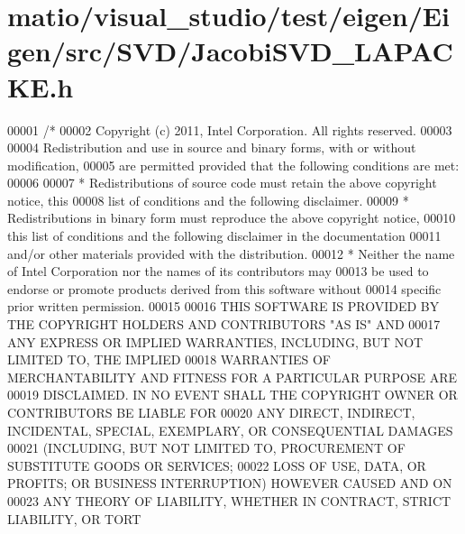 \hypertarget{matio_2visual__studio_2test_2eigen_2_eigen_2src_2_s_v_d_2_jacobi_s_v_d___l_a_p_a_c_k_e_8h_source}{}\section{matio/visual\+\_\+studio/test/eigen/\+Eigen/src/\+S\+V\+D/\+Jacobi\+S\+V\+D\+\_\+\+L\+A\+P\+A\+C\+KE.h}
\label{matio_2visual__studio_2test_2eigen_2_eigen_2src_2_s_v_d_2_jacobi_s_v_d___l_a_p_a_c_k_e_8h_source}

\begin{DoxyCode}
00001 \textcolor{comment}{/*}
00002 \textcolor{comment}{ Copyright (c) 2011, Intel Corporation. All rights reserved.}
00003 \textcolor{comment}{}
00004 \textcolor{comment}{ Redistribution and use in source and binary forms, with or without modification,}
00005 \textcolor{comment}{ are permitted provided that the following conditions are met:}
00006 \textcolor{comment}{}
00007 \textcolor{comment}{ * Redistributions of source code must retain the above copyright notice, this}
00008 \textcolor{comment}{   list of conditions and the following disclaimer.}
00009 \textcolor{comment}{ * Redistributions in binary form must reproduce the above copyright notice,}
00010 \textcolor{comment}{   this list of conditions and the following disclaimer in the documentation}
00011 \textcolor{comment}{   and/or other materials provided with the distribution.}
00012 \textcolor{comment}{ * Neither the name of Intel Corporation nor the names of its contributors may}
00013 \textcolor{comment}{   be used to endorse or promote products derived from this software without}
00014 \textcolor{comment}{   specific prior written permission.}
00015 \textcolor{comment}{}
00016 \textcolor{comment}{ THIS SOFTWARE IS PROVIDED BY THE COPYRIGHT HOLDERS AND CONTRIBUTORS "AS IS" AND}
00017 \textcolor{comment}{ ANY EXPRESS OR IMPLIED WARRANTIES, INCLUDING, BUT NOT LIMITED TO, THE IMPLIED}
00018 \textcolor{comment}{ WARRANTIES OF MERCHANTABILITY AND FITNESS FOR A PARTICULAR PURPOSE ARE}
00019 \textcolor{comment}{ DISCLAIMED. IN NO EVENT SHALL THE COPYRIGHT OWNER OR CONTRIBUTORS BE LIABLE FOR}
00020 \textcolor{comment}{ ANY DIRECT, INDIRECT, INCIDENTAL, SPECIAL, EXEMPLARY, OR CONSEQUENTIAL DAMAGES}
00021 \textcolor{comment}{ (INCLUDING, BUT NOT LIMITED TO, PROCUREMENT OF SUBSTITUTE GOODS OR SERVICES;}
00022 \textcolor{comment}{ LOSS OF USE, DATA, OR PROFITS; OR BUSINESS INTERRUPTION) HOWEVER CAUSED AND ON}
00023 \textcolor{comment}{ ANY THEORY OF LIABILITY, WHETHER IN CONTRACT, STRICT LIABILITY, OR TORT}

\end{DoxyCode}
